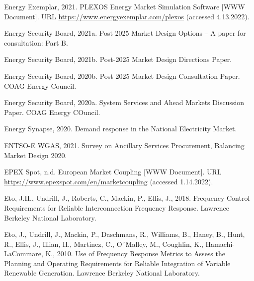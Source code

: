 \documentclass[12pt,a4paper,]{report}
\newlength{\cslhangindent}
\newenvironment{CSLReferences}[2] %
 {%
  \setlength{\parindent}{0pt}
  \ifodd #1 \everypar{\setlength{\hangindent}{\cslhangindent}}\ignorespaces\fi
  \ifnum #2 > 0
  \setlength{\parskip}{#2\baselineskip}
  \fi
 }%
 {}
\begin{document}
\begin{CSLReferences}{1}{0}
\leavevmode{}%
Energy Exemplar, 2021. {PLEXOS} \textbar{} {Energy Market Simulation
Software} {[}WWW Document{]}. URL
\url{https://www.energyexemplar.com/plexos} (accessed 4.13.2022).

\leavevmode{}%
Energy Security Board, 2021a. Post 2025 {Market Design Options} -- {A}
paper for consultation: {Part B}.

\leavevmode{}%
Energy Security Board, 2021b. Post-2025 {Market Design Directions
Paper}.

\leavevmode{}%
Energy Security Board, 2020b. Post 2025 {Market Design Consultation
Paper}. {COAG Energy Council}.

\leavevmode{}%
Energy Security Board, 2020a. System {Services} and {Ahead Markets
Discussion Paper}. {COAG Energy COuncil}.

\leavevmode{}%
Energy Synapse, 2020. Demand response in the {National Electricity
Market}.

\leavevmode{}%
ENTSO-E WGAS, 2021. Survey on {Ancillary Services Procurement},
{Balancing Market Design} 2020.

\leavevmode{}%
EPEX Spot, n.d. European {Market Coupling} {[}WWW Document{]}. URL
\url{https://www.epexspot.com/en/marketcoupling} (accessed 1.14.2022).

\leavevmode{}%
Eto, J.H., Undrill, J., Roberts, C., Mackin, P., Ellis, J., 2018.
Frequency {Control Requirements} for {Reliable Interconnection Frequency
Response}. {Lawrence Berkeley National Laboratory}.

\leavevmode{}%
Eto, J., Undrill, J., Mackin, P., Daschmans, R., Williams, B., Haney,
B., Hunt, R., Ellis, J., Illian, H., Martinez, C., O´Malley, M.,
Coughlin, K., Hamachi-LaCommare, K., 2010. Use of {Frequency Response
Metrics} to {Assess} the {Planning} and {Operating Requirements} for
{Reliable Integration} of {Variable Renewable Generation}. {Lawrence
Berkeley National Laboratory}.


\end{CSLReferences}
\end{document}
